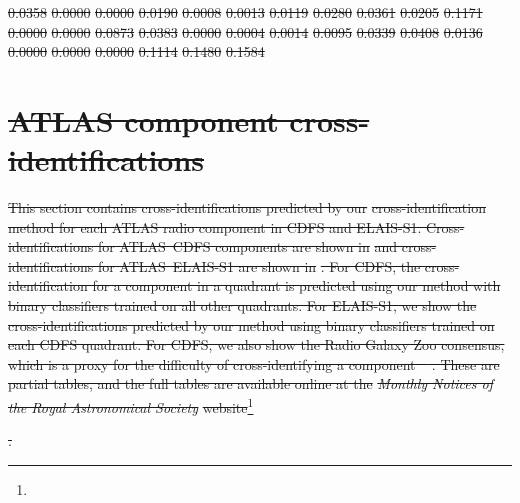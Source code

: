 \documentclass[11pt, a4paper]{book}
\providecommand{\DIFdeltex}[1]{{\protect\color{red}\sout{#1}}}                      %
\providecommand{\DIFdel}[1]{\texorpdfstring{\DIFdeltex{#1}}{}} %
\begin{document}
\DIFdel{0.0358 }%
\DIFdel{0.0000 }%
\DIFdel{0.0000 }%
\DIFdel{0.0190 }%
\DIFdel{0.0008 }%
\DIFdel{0.0013 }%
\DIFdel{0.0119 }%
\DIFdel{0.0280 }%
\DIFdel{0.0361 }%
\DIFdel{0.0205 }%
\DIFdel{0.1171 }%
\DIFdel{0.0000 }%
\DIFdel{0.0000 }%
\DIFdel{0.0873 }%
\DIFdel{0.0383 }%
\DIFdel{0.0000 }%
\DIFdel{0.0004 }%
\DIFdel{0.0014 }%
\DIFdel{0.0095 }%
\DIFdel{0.0339 }%
\DIFdel{0.0408 }%
\DIFdel{0.0136 }%
\DIFdel{0.0000 }%
\DIFdel{0.0000 }%
\DIFdel{0.0000 }%
\DIFdel{0.1114 }%
\DIFdel{0.1480 }%
\DIFdel{0.1584 }%

\section{\DIFdel{ATLAS component cross-identifications}}%
\addtocounter{section}{-1}%

\DIFdel{This section contains cross-identifications predicted by our }%
\DIFdel{cross-identification method for each
  ATLAS radio component in CDFS and ELAIS-S1. Cross-identifications for
  ATLAS~CDFS components are shown in }%
\DIFdel{and
  cross-identifications for ATLAS~ELAIS-S1 are shown in
  }%
\DIFdel{. For CDFS, the cross-identification for a component
  in a quadrant is predicted using our method with binary classifiers trained
  on all other quadrants. For ELAIS-S1, we show the cross-identifications
  predicted by our method using binary classifiers trained on each CDFS
  quadrant. For CDFS, we also show the Radio Galaxy Zoo consensus, which is a
  proxy for the difficulty of cross-identifying a component \mbox{%
\citep{wong21rgz}}\hspace{0pt}%
. These are partial tables, and the full tables are available online at the }\emph{\DIFdel{Monthly Notices of the Royal Astronomical Society}} %
\DIFdel{website}\footnote{%
}%
\addtocounter{footnote}{-1}%
\DIFdel{.
}%
\end{document}
